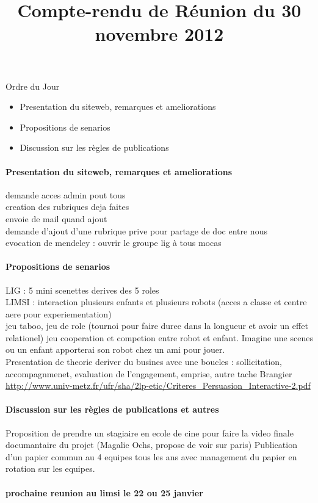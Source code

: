 \documentclass[11pt]{article} %
\title{Compte-rendu de R\'eunion du 30 novembre 2012}
\begin{document}
\maketitle

Ordre du Jour 
\begin{itemize}
\item Presentation du siteweb, remarques et ameliorations
\item Propositions de senarios
\item Discussion sur les règles de publications
\end{itemize}



\paragraph{Presentation du siteweb, remarques et ameliorations}
demande acces admin pout tous \\
creation des rubriques deja faites \\
envoie de mail quand ajout \\
demande d'ajout d'une rubrique prive pour partage de doc entre nous \\
evocation de mendeley : ouvrir le groupe lig à tous mocas
\paragraph{Propositions de senarios}
LIG : 5 mini scenettes  derives des 5 roles \\
LIMSI : interaction plusieurs enfants et plusieurs robots (acces a classe et centre aere pour experiementation) \\
jeu taboo, jeu de role (tournoi pour faire duree dans la longueur et avoir un effet relationel) jeu cooperation et competion entre robot et enfant. Imagine une scenes ou un enfant apporterai son robot chez un ami pour jouer.  \\
Presentation de theorie deriver du busines  avec une boucles : sollicitation, accompagnmenet, evaluation de l'engagement, emprise, autre tache  Brangier \url{http://www.univ-metz.fr/ufr/sha/2lp-etic/Criteres_Persuasion_Interactive-2.pdf}


\paragraph{Discussion sur les règles de publications et autres}
Proposition de prendre un stagiaire en ecole de cine pour faire la video finale documantaire du projet (Magalie Ochs, propose de voir sur paris)
Publication d'un papier commun au 4 equipes tous les ans avec management du papier en rotation sur les equipes. 

\paragraph{prochaine reunion au limsi le 22 ou 25 janvier}
\end{document}
